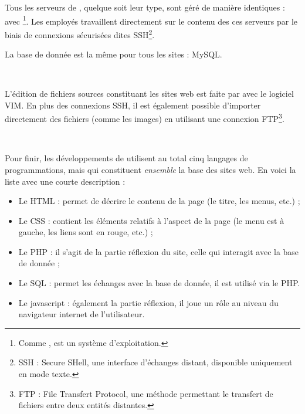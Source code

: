 Tous les serveurs de \fidit, quelque soit leur type, sont géré de manière identiques : avec \footnote{Comme ,  est un système d'exploitation.}. Les employés travaillent directement sur le contenu des ces serveurs par le biais de connexions sécurisées dites SSH\footnote{SSH : Secure SHell, une interface d'échanges distant, disponible uniquement en mode texte.}.

La base de donnée est la même pour tous les sites : MySQL.

~

L'édition de fichiers sources constituant les sites web est faite par avec le logiciel VIM. En plus des connexions SSH, il est également possible d'importer directement des fichiers (comme les images) en utilisant une connexion FTP\footnote{FTP : File Transfert Protocol, une méthode permettant le transfert de fichiers entre deux entités distantes.}.

~

Pour finir, les développements de \fidit{} utilisent au total cinq langages de programmations, mais qui constituent \emph{ensemble} la base des sites web. En voici la liste avec une courte description :
\begin{itemize}
	\item Le HTML : permet de décrire le contenu de la page (le titre, les menus, etc.) ;
	\item Le CSS : contient les éléments relatifs à l'aspect de la page (le menu est à gauche, les liens sont en rouge, etc.) ;
	\item Le PHP : il s'agit de la partie \og réflexion \fg du site, celle qui interagit avec la base de donnée ;
	\item Le SQL : permet les échanges avec la base de donnée, il est utilisé via le PHP.
	\item Le javascript : également la partie réflexion, il joue un rôle au niveau du navigateur internet de l'utilisateur.
\end{itemize}
